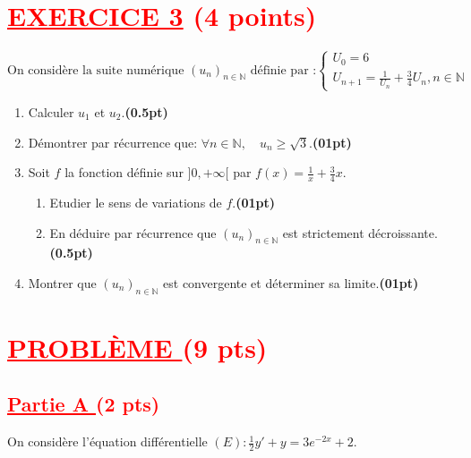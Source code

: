 \documentclass[12pt]{article}
\begin{document}
\section*{\textcolor{red}{\underline{EXERCICE 3} (4 points) }}
\[
\text{On considère la suite numérique } (u_n)_{n \in \mathbb{N}} \text{ définie par :}
\begin{cases}
U_{0}=6\\
U_{n+1}=\frac{1}{U_{n}}+\frac{3}{4}U_{n}, n\in\mathbb{N}
\end{cases}
\]
\begin{enumerate}
\item[1)] Calculer \( u_1 \) et \( u_2 \).\hfill\textbf{(0.5pt)}

\item[2)] Démontrer par récurrence que: \( \forall n\in\mathbb{N},\quad u_n \geq \sqrt{3} \).\hfill\textbf{(01pt)}

\item[3)] Soit $f$ la fonction définie sur $]0, +\infty[$ par \( f(x) = \frac{1}{x} + \frac{3}{4}x \).
\begin{enumerate}
\item[a)] Etudier le sens de variations de $f$.\hfill\textbf{(01pt)}
\item[b)] En déduire par récurrence que $(u_n)_{n \in \mathbb{N}}$ est strictement décroissante.\hfill\textbf{(0.5pt)}
\end{enumerate}

\item[4)] Montrer que $(u_n)_{n \in \mathbb{N}}$ est convergente et déterminer sa limite.\hfill\textbf{(01pt)}

\end{enumerate}
\section*{\textcolor{red}{\underline{PROBLÈME } (9 pts) }}
\subsection*{\textcolor{red}{\underline{Partie A }(2 pts)}}
On considère l'équation différentielle $(E):\frac{1}{2}y'+y=3e^{-2x}+2.$
\end{document}
